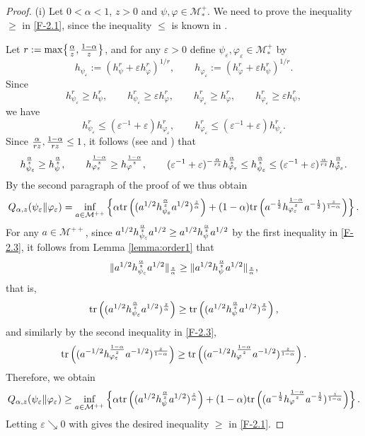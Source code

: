 \documentclass[12pt]{article}
\theoremstyle{definition}
\theoremstyle{remark}
\numberwithin{equation}{section}
\def\Me{\mathcal M}
\def\Tr{\mathrm{tr}}
\def\eps{\varepsilon}
\begin{document}
\begin{proof}
(i)\enspace
Let $0<\alpha<1$, $z>0$ and $\psi,\varphi\in\Me_*^+$. We need to prove the inequality $\ge$ in
\eqref{F-2.1}, since the inequality $\le$ is known in \cite[Theorem 1(vi)]{kato2023onrenyi}.

Let $r:=\max\bigl\{{\alpha\over z},{1-\alpha\over z}\bigr\}$, and for any $\eps>0$ define
$\psi_\eps,\varphi_\eps\in\Me_*^+$ by
\[
h_{\psi_\eps}:=(h_\psi^r+\eps h_\varphi^r)^{1/r},\qquad
h_{\varphi_\eps}:=(h_\varphi^r+\eps h_\psi^r)^{1/r}.
\]
Since
\[
h_{\psi_\eps}^r\ge h_\psi^r,\qquad h_{\psi_\eps}^r\ge\eps h_\varphi^r,\qquad
h_{\varphi_\eps}^r\ge h_\varphi^r,\qquad h_{\varphi_\eps}^r\ge\eps h_\psi^r,
\]
we have
\[
h_{\psi_\eps}^r\le(\eps^{-1}+\eps)h_{\varphi_\eps}^r,\qquad
h_{\varphi_\eps}^r\le(\eps^{-1}+\eps)h_{\psi_\eps}^r.
\]
Since ${\alpha\over rz},{1-\alpha\over rz}\le1$, it follows (see \cite[Lemma B.7]{hiai2021quantum} and
\cite[Lemma 3.2]{hiai2021connections}) that
\begin{align}\label{F-2.3}
h_{\psi_\eps}^{\alpha\over z}\ge h_\psi^{\alpha\over z},\qquad
h_{\varphi_\eps}^{1-\alpha\over z}\ge h_\varphi^{1-\alpha\over z},\qquad
(\eps^{-1}+\eps)^{-{\alpha\over rz}}h_{\varphi_\eps}^{\alpha\over z}
\le h_{\psi_\eps}^{\alpha\over z}\le
(\eps^{-1}+\eps)^{\alpha\over rz}h_{\varphi_\eps}^{\alpha\over z}.
\end{align}
By the second paragraph of the proof of \cite[Theorem 1(vi)]{kato2023onrenyi} we thus obtain
\[
Q_{\alpha,z}(\psi_\eps\|\varphi_\eps)=\inf_{a\in\Me^{++}}
\left\{\alpha\Tr\left((a^{1/2}h_{\psi_\eps}^{\alpha\over z}a^{1/2})^{z\over\alpha}\right)
+(1-\alpha)\Tr\left(a^{-{1\over2}}h_{\varphi_\eps}^{1-\alpha\over z}a^{-{1\over2}})^{z\over1-\alpha}
\right)\right\}.
\]
For any $a\in\Me^{++}$, since
$a^{1/2}h_{\psi_\eps}^{\alpha\over z}a^{1/2}\ge a^{1/2}h_\psi^{\alpha\over z}a^{1/2}$ by the first
inequality in \eqref{F-2.3}, it follows from Lemma \ref{lemma:order1} that
\[
\|a^{1/2}h_{\psi_\eps}^{\alpha\over z}a^{1/2}\|_{z\over\alpha}
\ge\|a^{1/2}h_\psi^{\alpha\over z}a^{1/2}\|_{z\over\alpha},
\]
that is,
\[
\Tr\left((a^{1/2}h_{\psi_\eps}^{\alpha\over z}a^{1/2})^{z\over\alpha}\right)
\ge\Tr\left((a^{1/2}h_\psi^{\alpha\over z}a^{1/2})^{z\over\alpha}\right),
\]
and similarly by the second inequality in \eqref{F-2.3},
\[
\Tr\left((a^{-1/2}h_{\varphi_\eps}^{1-\alpha\over z}a^{-1/2})^{z\over1-\alpha}\right)
\ge\Tr\left((a^{-1/2}h_\varphi^{1-\alpha\over z}a^{-1/2})^{z\over1-\alpha}\right).
\]
Therefore, we obtain
\[
Q_{\alpha,z}(\psi_\eps\|\varphi_\eps)\ge\inf_{a\in\Me^{++}}
\left\{\alpha\Tr\left((a^{1/2}h_\psi^{\alpha\over z}a^{1/2})^{z\over\alpha}\right)
+(1-\alpha)\Tr\left((a^{-{1\over2}}h_\varphi^{1-\alpha\over z}a^{-{1\over2}})^{z\over1-\alpha}
\right)\right\}.
\]
Letting $\eps\searrow0$ with \cite[Lemma 6 and Theorem 1(iv)]{kato2023onrenyi} gives the desired
inequality $\ge$ in \eqref{F-2.1}.



\end{proof}
\end{document}
